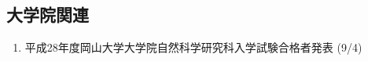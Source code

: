 \documentclass[fleqn, 14pt]{extarticle}
\begin{document}
    \subsection{大学院関連}
    \begin{enumerate}

        \item 平成28年度岡山大学大学院自然科学研究科入学試験合格者発表
            \hfill
            \label{enum-17}
            (9/4)

    \end{enumerate}

    
\end{document}
